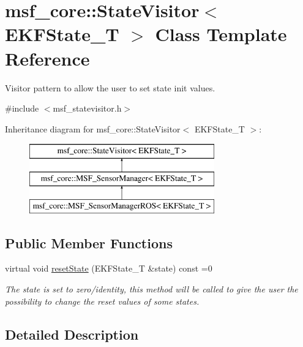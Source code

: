 \hypertarget{classmsf__core_1_1StateVisitor}{\section{msf\-\_\-core\-:\-:State\-Visitor$<$ E\-K\-F\-State\-\_\-\-T $>$ Class Template Reference}
\label{classmsf__core_1_1StateVisitor}
}


Visitor pattern to allow the user to set state init values.  




{\ttfamily \#include $<$msf\-\_\-statevisitor.\-h$>$}

Inheritance diagram for msf\-\_\-core\-:\-:State\-Visitor$<$ E\-K\-F\-State\-\_\-\-T $>$\-:\begin{figure}[H]
\begin{center}
\leavevmode
\includegraphics[height=3.000000cm]{classmsf__core_1_1StateVisitor}
\end{center}
\end{figure}
\subsection*{Public Member Functions}
\begin{DoxyCompactItemize}
\item 
\hypertarget{classmsf__core_1_1StateVisitor_a42a37cdfe7b7c4aa5d3c9f5f661ab581}{virtual void \hyperlink{classmsf__core_1_1StateVisitor_a42a37cdfe7b7c4aa5d3c9f5f661ab581}{reset\-State} (E\-K\-F\-State\-\_\-\-T \&state) const =0}\label{classmsf__core_1_1StateVisitor_a42a37cdfe7b7c4aa5d3c9f5f661ab581}

\begin{DoxyCompactList}\small\item\em The state is set to zero/identity, this method will be called to give the user the possibility to change the reset values of some states. \end{DoxyCompactList}\end{DoxyCompactItemize}


\subsection{Detailed Description}
